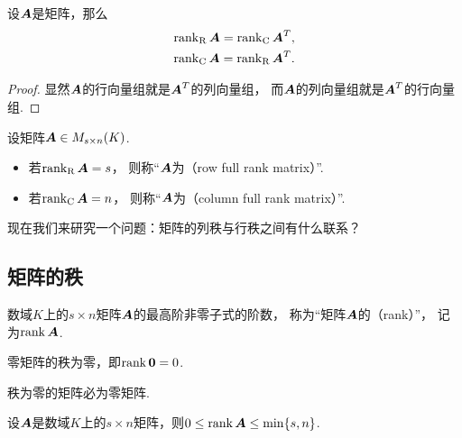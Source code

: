 \begin{proposition}\label{theorem:向量空间.矩阵的行秩与列秩分别等于它的转置矩阵的列秩与行秩}
设\(\boldsymbol{A}\)是矩阵，那么\begin{gather}
	\rank_{\mathrm{R}}\boldsymbol{A}=\rank_{\mathrm{C}}\boldsymbol{A}^T, \\
	\rank_{\mathrm{C}}\boldsymbol{A}=\rank_{\mathrm{R}}\boldsymbol{A}^T.
\end{gather}
\begin{proof}
显然\(\boldsymbol{A}\)的行向量组就是\(\boldsymbol{A}^T\)的列向量组，
而\(\boldsymbol{A}\)的列向量组就是\(\boldsymbol{A}^T\)的行向量组.
\end{proof}
\end{proposition}

\begin{definition}
设矩阵\(\boldsymbol{A} \in M_{s \times n}(K)\).
\begin{itemize}
	\item 若\(\rank_{\mathrm{R}}\boldsymbol{A} = s\)，
	则称“\(\boldsymbol{A}\)为（row full rank matrix）”.
	\item 若\(\rank_{\mathrm{C}}\boldsymbol{A} = n\)，
	则称“\(\boldsymbol{A}\)为（column full rank matrix）”.
\end{itemize}
\end{definition}

现在我们来研究一个问题：矩阵的列秩与行秩之间有什么联系？

\subsection{矩阵的秩}
\begin{definition}\label{definition:线性方程组.矩阵的秩的定义}
数域\(K\)上的\(s \times n\)矩阵\(\boldsymbol{A}\)的最高阶非零子式的阶数，
称为“矩阵\(\boldsymbol{A}\)的（rank）”，
记为\(\rank\boldsymbol{A}\).
\end{definition}

\begin{proposition}\label{theorem:向量空间.零矩阵的秩为零}
零矩阵的秩为零，即\(\rank\boldsymbol0 = 0\).
\end{proposition}
\begin{proposition}\label{theorem:向量空间.秩为零的矩阵必为零矩阵}
秩为零的矩阵必为零矩阵.
\end{proposition}

\begin{property}\label{theorem:线性方程组.矩阵的秩的性质2}
设\(\boldsymbol{A}\)是数域\(K\)上的\(s \times n\)矩阵，则\(0 \leq \rank\boldsymbol{A} \leq \min\{s,n\}\).
\end{property}

